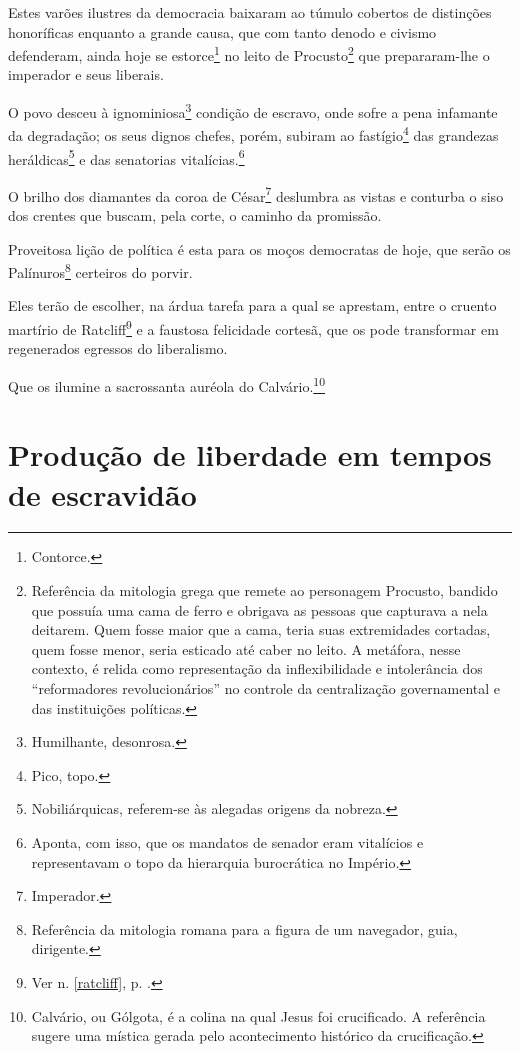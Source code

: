 Estes varões ilustres da democracia baixaram ao túmulo cobertos de
distinções honoríficas enquanto a grande causa, que com tanto denodo e
civismo defenderam, ainda hoje se estorce\footnote{Contorce.} no leito
de Procusto\footnote{Referência da mitologia grega que remete ao
  personagem Procusto, bandido que possuía uma cama de ferro e obrigava
  as pessoas que capturava a nela deitarem. Quem fosse maior que a cama,
  teria suas extremidades cortadas, quem fosse menor, seria esticado até
  caber no leito. A metáfora, nesse contexto, é relida como
  representação da inflexibilidade e intolerância dos ``reformadores
  revolucionários'' no controle da centralização governamental e das
  instituições políticas.} que prepararam-lhe o imperador e seus
liberais.

O povo desceu à ignominiosa\footnote{Humilhante, desonrosa.} condição
de escravo, onde sofre a pena infamante da degradação; os seus dignos
chefes, porém, subiram ao fastígio\footnote{Pico, topo.} das grandezas
heráldicas\footnote{Nobiliárquicas, referem-se às alegadas origens da
  nobreza.} e das senatorias vitalícias.\footnote{Aponta, com isso,
  que os mandatos de senador eram vitalícios e representavam o topo da
  hierarquia burocrática no Império.}

O brilho dos diamantes da coroa de César\footnote{Imperador.}
deslumbra as vistas e conturba o siso dos crentes que buscam, pela
corte, o caminho da promissão.

Proveitosa lição de política é esta para os moços democratas de hoje,
que serão os Palínuros\footnote{Referência da mitologia romana para a
  figura de um navegador, guia, dirigente.} certeiros do porvir.

Eles terão de escolher, na árdua tarefa para a qual se aprestam, entre o
cruento martírio de Ratcliff\footnote{Ver n. \ref{ratcliff}, p. \pageref{ratcliff}.} 
e a faustosa felicidade cortesã, que os pode transformar em regenerados 
egressos do liberalismo.

Que os ilumine a sacrossanta auréola do Calvário.\footnote{Calvário,
  ou Gólgota, é a colina na qual Jesus foi crucificado. A referência
  sugere uma mística gerada pelo acontecimento histórico da
  crucificação.}

\part{Produção de liberdade em tempos de escravidão} %

